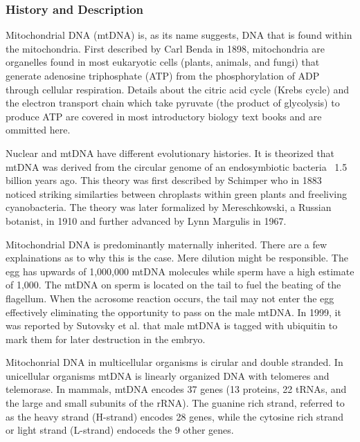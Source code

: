 \documentclass[11pt, oneside]{article}
\begin{document}
\subsubsection{History and Description}
Mitochondrial DNA (mtDNA) is, as its name suggests, DNA that is found within the mitochondria.
First described by Carl Benda in 1898, mitochondria are organelles found in most eukaryotic cells (plants, animals, and 
fungi) that generate adenosine triphosphate (ATP) from the phosphorylation of ADP through
cellular respiration. Details about the citric acid cycle (Krebs cycle) and the electron transport
chain which take pyruvate (the product of glycolysis) to produce ATP are covered in most 
introductory biology text books and are ommitted here. 

Nuclear and mtDNA have different evolutionary histories. It is theorized that mtDNA was derived from
the circular genome of an endosymbiotic bacteria ~1.5 billion years ago. This theory was first 
described by Schimper who in 1883 noticed striking similarties between chroplasts within green plants and 
freeliving cyanobacteria. The theory was later formalized by Mereschkowski, a Russian botanist, in 1910 and 
 further advanced by Lynn Margulis in 1967. 

Mitochondrial DNA is predominantly maternally inherited. There are a few explainations as to why
this is the case. Mere dilution might be responsible. The egg has upwards of 1,000,000 mtDNA molecules
while sperm have a high estimate of 1,000. The mtDNA on sperm is located on the tail to fuel the beating
of the flagellum. When the acrosome reaction occurs, the tail may not enter the egg effectively eliminating
the opportunity to pass on the male mtDNA. In 1999, it was reported by Sutovsky et al. that male
mtDNA is tagged with ubiquitin to mark them for later destruction in the embryo. 

Mitochonrial DNA in multicellular organisms is cirular and double stranded. In unicellular organisms mtDNA
is linearly organized DNA with telomeres and telemorase. In mammals, mtDNA encodes 37 genes (13 proteins, 
22 tRNAs, and the large and small subunits of the rRNA). The guanine rich strand, referred to
as the heavy strand (H-strand) encodes 28 genes, while the cytosine rich strand or light strand (L-strand)
endoceds the 9 other genes.  
\end{document}
